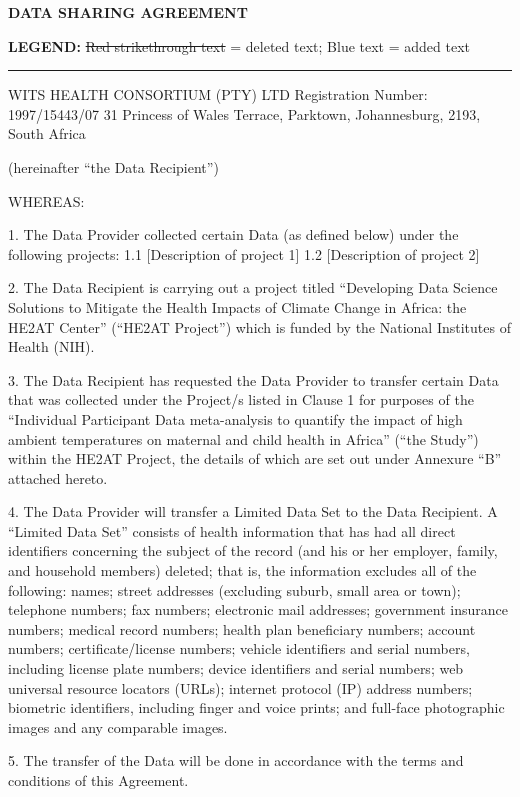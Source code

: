 \documentclass[12pt,letterpaper]{article}
\newcommand{\deleted}[1]{\textcolor{deletecolor}{\sout{#1}}}
\newcommand{\added}[1]{\textcolor{addcolor}{#1}}
\begin{document}
\onehalfspacing
\begin{center}
\textbf{\Large DATA SHARING AGREEMENT}
\end{center}
\textbf{LEGEND:} \deleted{Red strikethrough text} = deleted text; \added{Blue text} = added text
\vspace{0.5cm}
\hrule
\vspace{0.5cm}
WITS HEALTH CONSORTIUM (PTY) LTD Registration Number: 1997/15443/07 31 Princess of Wales Terrace, Parktown, Johannesburg, 2193, South Africa

(hereinafter “the Data Recipient”)

WHEREAS:

1.	The Data Provider collected certain Data (as defined below) under the following projects: 1.1	[Description of project 1] 1.2	[Description of project 2]

2.	The Data Recipient is carrying out a project titled “Developing Data Science Solutions to Mitigate the Health Impacts of Climate Change in Africa: the HE2AT Center” (“HE2AT Project”) which is funded by the National Institutes of Health (NIH).  

3.	The Data Recipient has requested the Data Provider to transfer certain Data that was collected under the Project/s listed in Clause 1 for purposes of the “Individual Participant Data meta-analysis to quantify the impact of high ambient temperatures on maternal and child health in Africa” (“the Study”) within the HE2AT Project, the details of which are set out under Annexure “B” attached hereto.  

4.	The Data Provider will transfer a Limited Data Set to the Data Recipient. A “Limited Data Set” consists of health information that has had all direct identifiers concerning the subject of the record (and his or her employer, family, and household members) deleted; that is, the information excludes all of the following: names; street addresses (excluding suburb, small area or town); telephone numbers; fax numbers; electronic mail addresses; government insurance numbers; medical record numbers; health plan beneficiary numbers; account numbers; certificate/license numbers; vehicle identifiers and serial numbers, including license plate numbers; device identifiers and serial numbers; web universal resource locators (URLs); internet protocol (IP) address numbers; biometric identifiers, including finger and voice prints; and full-face photographic images and any comparable images.

5.	The transfer of the Data will be done in accordance with the terms and conditions of this Agreement. 
\end{document}
